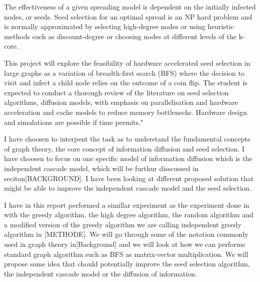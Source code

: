 The effectiveness of a given spreading model is dependent on the initially infected nodes, or seeds. Seed selection for an optimal spread is an NP hard problem and is normally approximated by selecting high-degree nodes or using heuristic methods such as discount-degree or choosing nodes at different levels of the k-core.

This project will explore the feasibility of hardware accelerated seed selection in large graphs as a variation of breadth-first search (BFS) where the decision to visit and infect a child node relies on the outcome of a coin flip. The student is expected to conduct a thorough review of the literature on seed selection algorithms, diffusion models, with emphasis on parallelisation and hardware acceleration and cache models to reduce memory bottlenecks. Hardware design and simulations are possible if time permits."

I have choosen to interpent the task as to understand the fundamental concepts of graph theory, the core concept of information diffusion and seed selection. I have choosen to focus on one specific model of information diffusion which is the independent cascade model, which will be furthur disscussed in seciton[BACKGROUND]. I have been looking at different proposed solution that might be able to improve the independent cascade model and the seed selection.

I have in this report performed a simillar experiment as the experiment done in \cite{Maximizespread2003} with the greedy algorithm, the high degree algorithm, the random algorithm and a modified version of the greedy algorithm we are calling independent greedy algorithm in [METHODE]. We will go through some of the notation commonly used in graph theory in[Background] and we will look at how we can performe standard graph algorithm such as BFS as matrix-vector multiplication. We will propose some idea that chould potentially improve the seed selection algorithm, the independent cascade model or the diffusion of information. 
